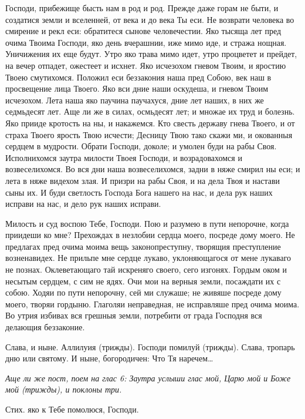

Господи, прибежище бысть нам в род и род. Прежде даже горам не быти, и создатися земли и вселенней, от века и до века Ты еси. Не возврати человека во смирение и рекл еси: обратитеся сынове человечестии. Яко тысяща лет пред очима Твоима Господи, яко день вчерашнии, иже мимо иде, и стража нощная. Уничижения их еще будут. Утро яко трава мимо идет, утро процветет и прейдет, на вечер отпадет, ожестеет и исхнет. Яко исчезохом гневом Твоим, и яростию Твоею смутихомся. Положил еси беззакония наша пред Собою, век наш в просвещение лица Твоего. Яко вси дние наши оскудеша, и гневом Твоим исчезохом. Лета наша яко паучина паучахуся, дние лет наших, в них же седмьдесят лет. Аще ли же в силах, осмьдесят лет; и множае их труд и болезнь. Яко прииде кротость на ны, и накажемся. Кто свесть державу гнева Твоего, и от страха Твоего ярость Твою исчести; Десницу Твою тако скажи ми, и окованныя сердцем в мудрости. Обрати Господи, доколе; и умолен буди на рабы Своя. Исполнихомся заутра милости Твоея Господи, и возрадовахомся и возвеселихомся. Во вся дни наша возвеселихомся, задни в няже смирил ны еси; и лета в няже видехом злая. И призри на рабы Своя, и на дела Твоя и настави сыны их. И буди светлость Господа Бога нашего на нас, и дела рук наших исправи на нас, и дело рук наших исправи.




Милость и суд воспою Тебе, Господи. Пою и разумею в пути непорочне, когда приидеши ко мне? Прехождах в незлобии сердца моего, посреде дому моего. Не предлагах пред очима моима вещь законопреступну, творящия преступление возненавидех. Не прильпе мне сердце лукаво, уклоняющагося от мене лукаваго не познах. Оклеветающаго тай искреняго своего, сего изгонях. Гордым оком и несытым сердцем, с сим не ядях. Очи мои на верныя земли, посаждати их с собою. Ходяи по пути непорочну, сей ми служаше; не живяше посреде дому моего, творяи гордыню. Глаголяи неправедная, не исправляше пред очима моима. Во утрия избивах вся грешныя земли, потребити от града Господня вся делающия беззаконие. 

Слава, и ныне. Аллилуия (трижды). Господи помилуй (трижды). Слава, тропарь дню или святому. И ныне, богородичен: Что Тя наречем…


\itshape Аще ли же пост, поем на глас 6:\normalfont{} Заутра услыши глас мой, Царю мой и Боже мой (трижды), и поклоны три.

Стих. яко к Тебе помолюся, Господи.


